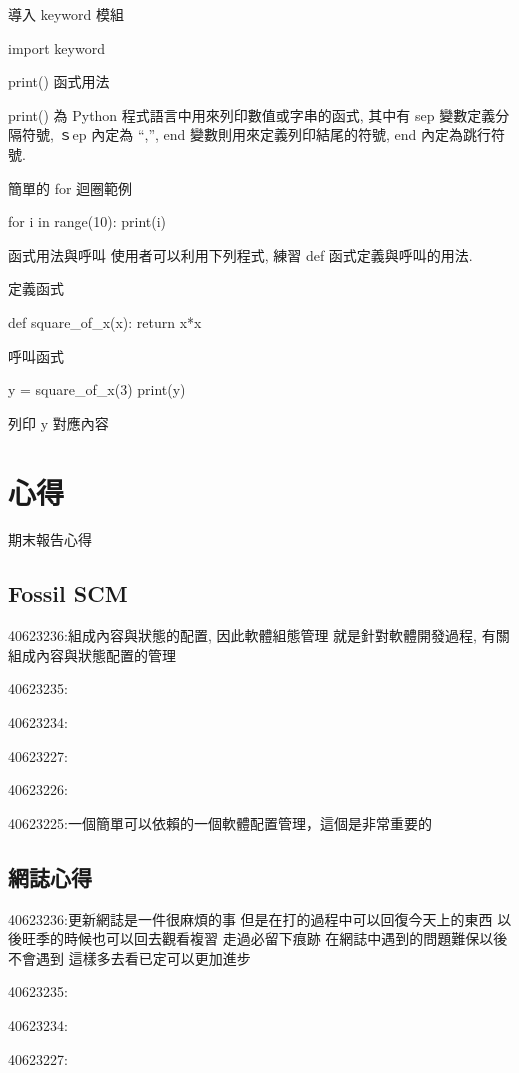 \documentclass[12pt,,]{report}
\begin{document}
導入 keyword 模組

import keyword

print() 函式用法

print() 為 Python 程式語言中用來列印數值或字串的函式, 其中有 sep
變數定義分隔符號, ｓep 內定為 ``,'', end 變數則用來定義列印結尾的符號,
end 內定為跳行符號.

簡單的 for 迴圈範例

for i in range(10): print(i)

函式用法與呼叫 使用者可以利用下列程式, 練習 def 函式定義與呼叫的用法.

定義函式

def square\_of\_x(x): return x*x

呼叫函式

y = square\_of\_x(3) print(y)

列印 y 對應內容

\hypertarget{ux5fc3ux5f97}{%
\chapter{心得}\label{ux5fc3ux5f97}}

期末報告心得

\hypertarget{fossil-scm}{%
\section{Fossil SCM}\label{fossil-scm}}

40623236:組成內容與狀態的配置, 因此軟體組態管理 就是針對軟體開發過程,
有關組成內容與狀態配置的管理

40623235:

40623234:

40623227:

40623226:

40623225:一個簡單可以依賴的一個軟體配置管理，這個是非常重要的

\hypertarget{ux7db2ux8a8cux5fc3ux5f97}{%
\section{網誌心得}\label{ux7db2ux8a8cux5fc3ux5f97}}

40623236:更新網誌是一件很麻煩的事 但是在打的過程中可以回復今天上的東西
以後旺季的時候也可以回去觀看複習 走過必留下痕跡
在網誌中遇到的問題難保以後不會遇到 這樣多去看已定可以更加進步

40623235:

40623234:

40623227:
\end{document}
